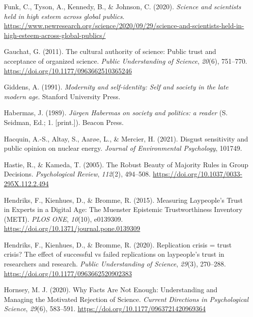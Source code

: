 \documentclass[
  jou,
  floatsintext,
  longtable,
  nolmodern,
  notxfonts,
  notimes,
  colorlinks=true,linkcolor=blue,citecolor=blue,urlcolor=blue]{apa7}
\newlength{\cslhangindent}
\newenvironment{CSLReferences}[2] %
 {\begin{list}{}{%
  \setlength{\itemindent}{0pt}
  \setlength{\leftmargin}{0pt}
  \setlength{\parsep}{0pt}
  \ifodd #1
   \setlength{\leftmargin}{\cslhangindent}
   \setlength{\itemindent}{-1\cslhangindent}
  \fi
  \setlength{\itemsep}{#2\baselineskip}}}
 {\end{list}}
\begin{document}
\begin{CSLReferences}{1}{0}
Funk, C., Tyson, A., Kennedy, B., \& Johnson, C. (2020). \emph{Science
and scientists held in high esteem across global publics}.
\url{https://www.pewresearch.org/science/2020/09/29/science-and-scientists-held-in-high-esteem-across-global-publics/}

Gauchat, G. (2011). The cultural authority of science: Public trust and
acceptance of organized science. \emph{Public Understanding of Science},
\emph{20}(6), 751--770. \url{https://doi.org/10.1177/0963662510365246}

Giddens, A. (1991). \emph{Modernity and self-identity: Self and society
in the late modern age}. Stanford University Press.

Habermas, J. (1989). \emph{Jürgen Habermas on society and politics: a
reader} (S. Seidman, Ed.; 1. {[}print.{]}). Beacon Press.

Hacquin, A.-S., Altay, S., Aarøe, L., \& Mercier, H. (2021). Disgust
sensitivity and public opinion on nuclear energy. \emph{Journal of
Environmental Psychology}, 101749.

Hastie, R., \& Kameda, T. (2005). The Robust Beauty of Majority Rules in
Group Decisions. \emph{Psychological Review}, \emph{112}(2), 494--508.
\url{https://doi.org/10.1037/0033-295X.112.2.494}

Hendriks, F., Kienhues, D., \& Bromme, R. (2015). Measuring
Laypeople{'}s Trust in Experts in a Digital Age: The Muenster Epistemic
Trustworthiness Inventory (METI). \emph{PLOS ONE}, \emph{10}(10),
e0139309. \url{https://doi.org/10.1371/journal.pone.0139309}

Hendriks, F., Kienhues, D., \& Bromme, R. (2020). Replication crisis =
trust crisis? The effect of successful vs failed replications on
laypeople{'}s trust in researchers and research. \emph{Public
Understanding of Science}, \emph{29}(3), 270--288.
\url{https://doi.org/10.1177/0963662520902383}

Hornsey, M. J. (2020). Why Facts Are Not Enough: Understanding and
Managing the Motivated Rejection of Science. \emph{Current Directions in
Psychological Science}, \emph{29}(6), 583--591.
\url{https://doi.org/10.1177/0963721420969364}


\end{CSLReferences}
\end{document}
